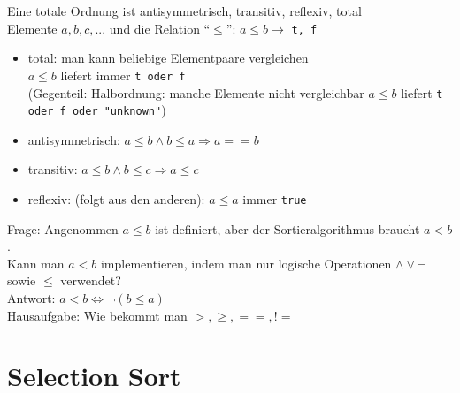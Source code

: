         Eine totale Ordnung ist antisymmetrisch, transitiv, reflexiv, total \\
        Elemente $a,b,c,...$ und die Relation ``$\leq$'': $a \leq b \rightarrow$ \verb|t, f| \\
        \begin{itemize}
                \item total: man kann beliebige Elementpaare vergleichen \\
                $a \leq b$ liefert immer \verb|t oder f| \\
                (Gegenteil: Halbordnung: manche Elemente nicht vergleichbar
                $a\leq b$ liefert \verb|t oder f oder "unknown"|)

                \item antisymmetrisch: $a \leq b \land b \leq a \Rightarrow a == b$
                \item transitiv: $ a \leq b \land b \leq c \Rightarrow a \leq c$
                \item reflexiv: (folgt aus den anderen): $a \leq a$ immer \verb|true|
        \end{itemize}

            Frage: Angenommen $a \leq b$ ist definiert, aber der Sortieralgorithmus braucht $a < b$. \\
            Kann man $a < b$ implementieren, indem man nur logische Operationen $\land \lor \lnot$ sowie $\leq$ verwendet? \\

            Antwort: $a < b \Leftrightarrow \lnot(b \leq a)$ \\

            Hausaufgabe: Wie bekommt man $>, \geq, ==, !=$ \\

            \section{Selection Sort}

